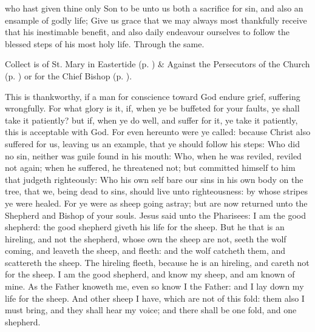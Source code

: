 \collect\label{EasterIICollect}
 who hast given thine only Son to be unto us both a sacrifice for sin, and also an ensample of godly life; Give us grace that we may always most thankfully receive that his inestimable benefit, and also daily endeavour ourselves to follow the blessed steps of his most holy life. Through the same.
\begin{rubric}
     Collect is of St. Mary in Eastertide (p. \pageref{SPMaryInEaster}) \&  Against the Persecutors of the Church (p. \pageref{SPAgainst}) or for the Chief Bishop (p. \pageref{SPChiefBishop}).
\end{rubric}
 This is thankworthy, if a man for conscience toward God endure grief, suffering wrongfully. For what glory is it, if, when ye be buffeted for your faults, ye shall take it patiently? but if, when ye do well, and suffer for it, ye take it patiently, this is acceptable with God. For even hereunto were ye called: because Christ also suffered for us, leaving us an example, that ye should follow his steps: Who did no sin, neither was guile found in his mouth: Who, when he was reviled, reviled not again; when he suffered, he threatened not; but committed himself to him that judgeth righteously: Who his own self bare our sins in his own body on the tree, that we, being dead to sins, should live unto righteousness: by whose stripes ye were healed. For ye were as sheep going astray; but are now returned unto the Shepherd and Bishop of your souls.
 Jesus said unto the Pharisees: I am the good shepherd: the good shepherd giveth his life for the sheep. But he that is an hireling, and not the shepherd, whose own the sheep are not, seeth the wolf coming, and leaveth the sheep, and fleeth: and the wolf catcheth them, and scattereth the sheep. The hireling fleeth, because he is an hireling, and careth not for the sheep. I am the good shepherd, and know my sheep, and am known of mine. As the Father knoweth me, even so know I the Father: and I lay down my life for the sheep. And other sheep I have, which are not of this fold: them also I must bring, and they shall hear my voice; and there shall be one fold, and one shepherd.
